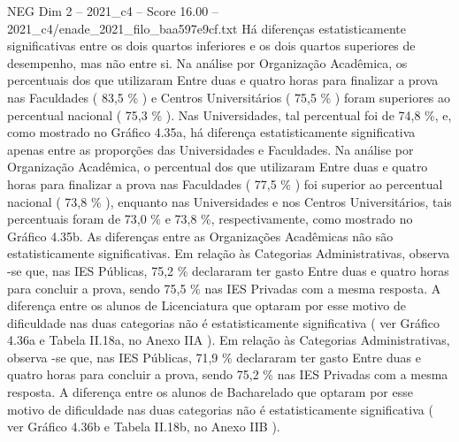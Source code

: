 \begin{textsample}{NEG Dim 2 – 2021\_c4 – Score 16.00 – 2021\_c4/enade\_2021\_filo\_baa597e9cf.txt}
Há diferenças estatisticamente significativas entre os dois quartos inferiores e os dois quartos superiores de desempenho, mas não entre si.
Na análise por Organização Acadêmica, os percentuais dos que utilizaram Entre duas e quatro horas para finalizar a prova nas Faculdades ( 83,5 \% ) e Centros Universitários ( 75,5 \% ) foram superiores ao percentual nacional ( 75,3 \% ).
Nas Universidades, tal percentual foi de 74,8 \%, e, como mostrado no Gráfico 4.35a, há diferença estatisticamente significativa apenas entre as proporções das Universidades e Faculdades.
Na análise por Organização Acadêmica, o percentual dos que utilizaram Entre duas e quatro horas para finalizar a prova nas Faculdades ( 77,5 \% ) foi superior ao percentual nacional ( 73,8 \% ), enquanto nas Universidades e nos Centros Universitários, tais percentuais foram de 73,0 \% e 73,8 \%, respectivamente, como mostrado no Gráfico 4.35b.
As diferenças entre as Organizações Acadêmicas não são estatisticamente significativas.
Em relação às Categorias Administrativas, observa -se que, nas IES Públicas, 75,2 \% declararam ter gasto Entre duas e quatro horas para concluir a prova, sendo 75,5 \% nas IES Privadas com a mesma resposta.
A diferença entre os alunos de Licenciatura que optaram por esse motivo de dificuldade nas duas categorias não é estatisticamente significativa ( ver Gráfico 4.36a e Tabela II.18a, no Anexo IIA ).
Em relação às Categorias Administrativas, observa -se que, nas IES Públicas, 71,9 \% declararam ter gasto Entre duas e quatro horas para concluir a prova, sendo 75,2 \% nas IES Privadas com a mesma resposta.
A diferença entre os alunos de Bacharelado que optaram por esse motivo de dificuldade nas duas categorias não é estatisticamente significativa ( ver Gráfico 4.36b e Tabela II.18b, no Anexo IIB ).

\end{textsample}
